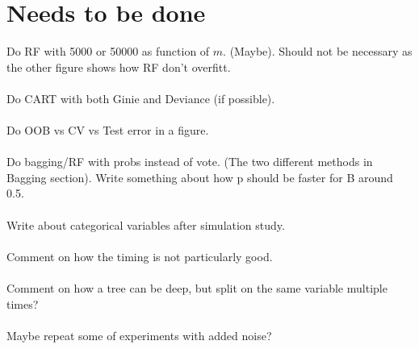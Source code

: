\section{Needs to be done}
\label{sec:Needs to be done}
Do RF with 5000 or 50000 as function of $m$. (Maybe). Should not be necessary as the other figure shows how RF don't overfitt.\\
\\
Do CART with both Ginie and Deviance (if possible). \\
\\
Do OOB vs CV vs Test error in a figure. \\
\\
Do bagging/RF with probs instead of vote. (The two different methods in Bagging section). Write something about how p should be faster for B around 0.5.\\
\\
Write about categorical variables after simulation study. \\
\\
Comment on how the timing is not particularly good. \\
\\
Comment on how a tree can be deep, but split on the same variable multiple times?\\
\\
Maybe repeat some of experiments with added noise?
